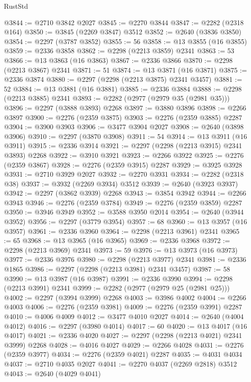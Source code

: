 \begin{lexlean}{RustStd}
\begin{coremodule}
@3844 := @2710 @3842 @2027
@3845 := @2270 @3844
@3847 := @2282 (@2318 @164)
@3850 := @3845 (@2269 @3847) @3512
@3852 := @2640 (@3836 @3850)
@3854 := @2297 (@3787 @3852)
@3855 := 56
@3858 := @13 @3855 (@16 @3855)
@3859 := @2336 @3858
@3862 := @2298 (@2213 @3859) @2341
@3863 := 53
@3866 := @13 @3863 (@16 @3863)
@3867 := @2336 @3866
@3870 := @2298 (@2213 @3867) @2341
@3871 := 51
@3874 := @13 @3871 (@16 @3871)
@3875 := @2336 @3874
@3880 := @2297 (@2298 (@2213 @3875) @2341 @3457)
@3881 := 52
@3884 := @13 @3881 (@16 @3881)
@3885 := @2336 @3884
@3888 := @2298 (@2213 @3885) @2341
@3893 := @2282 (@2977 (@2979 @35 (@2981 @35)))
@3896 := @2297 (@3888 @3893) @2268
@3897 := @3880 @3896
@3898 := @2266 @3897
@3900 := @2276 (@2359 @3875)
@3903 := @2276 (@2359 @3885) @2287
@3904 := @3900 @3903
@3906 := @3477 @3904 @2027
@3908 := @2640 (@3898 @3906)
@3910 := @2297 (@3870 @3908)
@3911 := 54
@3914 := @13 @3911 (@16 @3911)
@3915 := @2336 @3914
@3921 := @2297 (@2298 (@2213 @3915) @2341 @3893) @2268
@3922 := @3910 @3921
@3923 := @2266 @3922
@3925 := @2276 (@2359 @3867)
@3928 := @2276 (@2359 @3915) @2287
@3929 := @3925 @3928
@3931 := @2710 @3929 @2027
@3932 := @2270 @3931
@3934 := @2282 (@2318 @38)
@3937 := @3932 (@2269 @3934) @3512
@3939 := @2640 (@3923 @3937)
@3942 := @2297 (@3862 @3939) @2268
@3943 := @3854 @3942
@3944 := @2266 @3943
@3946 := @2276 (@2359 @3784)
@3949 := @2276 (@2359 @3859) @2287
@3950 := @3946 @3949
@3952 := @3588 @3950 @2014
@3954 := @2640 (@3944 @3952)
@3956 := @2297 (@3779 @3954)
@3957 := 68
@3960 := @13 @3957 (@16 @3957)
@3961 := @2336 @3960
@3964 := @2298 (@2213 @3961) @2341
@3965 := 65
@3968 := @13 @3965 (@16 @3965)
@3969 := @2336 @3968
@3972 := @2298 (@2213 @3969) @2341
@3973 := 59
@3976 := @13 @3973 (@16 @3973)
@3977 := @2336 @3976
@3980 := @2298 (@2213 @3977) @2341
@3981 := @2336 @1865
@3986 := @2297 (@2298 (@2213 @3981) @2341 @3457)
@3987 := 58
@3990 := @13 @3987 (@16 @3987)
@3991 := @2336 @3990
@3994 := @2298 (@2213 @3991) @2341
@3999 := @2282 (@2977 (@2979 @25 (@2981 @25)))
@4002 := @2297 (@3994 @3999) @2268
@4003 := @3986 @4002
@4004 := @2266 @4003
@4006 := @2276 (@2359 @3981)
@4009 := @2276 (@2359 @3991) @2287
@4010 := @4006 @4009
@4012 := @3477 @4010 @2027
@4014 := @2640 (@4004 @4012)
@4016 := @2297 (@3980 @4014)
@4017 := 60
@4020 := @13 @4017 (@16 @4017)
@4021 := @2336 @4020
@4027 := @2297 (@2298 (@2213 @4021) @2341 @3999) @2268
@4028 := @4016 @4027
@4029 := @2266 @4028
@4031 := @2276 (@2359 @3977)
@4034 := @2276 (@2359 @4021) @2287
@4035 := @4031 @4034
@4037 := @2710 @4035 @2027
@4041 := @2270 @4037 (@2269 @2818) @3512
@4043 := @2640 (@4029 @4041)

\end{coremodule}
\end{lexlean}
